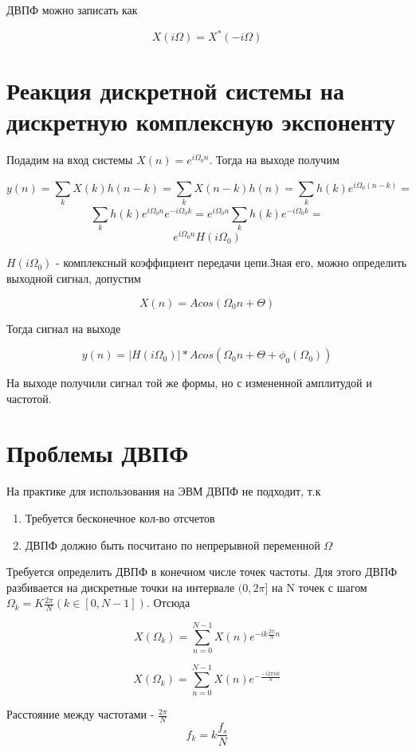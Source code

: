 ДВПФ можно записать как

$$X(i\Omega) = X^*(-i\Omega)$$

\section{Реакция дискретной системы на дискретную комплексную экспоненту}

Подадим на вход системы $X(n) = e^{i\Omega_0n}$. Тогда на выходе получим

$$y(n) = \sum_{k}^{}X(k)h(n-k) = \sum_{k}^{}X(n-k)h(n) = \sum_{k}^{}h(k)e^{i\Omega_0(n-k)} = $$
$$\sum_{k}^{}h(k)e^{i\Omega_0n}e^{-i\Omega_0k} = e^{i\Omega_0n}\sum_{k}^{}h(k)e^{-i\Omega_0k} = $$
$$e^{i\Omega_0n}H(i\Omega_0)$$

$H(i\Omega_0)$ - комплексный коэффициент передачи цепи.Зная его, можно определить выходной сигнал, допустим

$$X(n) = Acos(\Omega_0n + \Theta)$$

Тогда сигнал на выходе

$$y(n) = |H(i\Omega_0)|*Acos(\Omega_0n + \Theta + \phi_0(\Omega_0))$$

На выходе получили сигнал той же формы, но с измененной амплитудой и частотой.

\section{Проблемы ДВПФ}


На практике для использования на ЭВМ ДВПФ не подходит, т.к 

\begin{enumerate}
    \item Требуется бесконечное кол-во отсчетов
    \item ДВПФ должно быть посчитано по непрерывной переменной $\Omega$
\end{enumerate}

Требуется определить ДВПФ в конечном числе точек частоты. Для этого ДВПФ разбивается на дискретные точки на интервале $(0,2\pi]$
на N точек с шагом $\Omega_k = K\frac{2\pi}{N} (k\in[0, N-1])$. Отсюда

$$X(\Omega_k) = \sum_{n=0}^{N-1}X(n)e^{-ik\frac{2\pi}{N}n}$$

$$\boxed{X(\Omega_k) = \sum_{n=0}^{N-1}X(n)e^{-\frac{-i2\pi nk}{N}}}$$

Расстояние между частотами - $\frac{2\pi}{N}$ \\

$$\boxed{f_k = k\frac{f_s}{N}}$$


\endinput